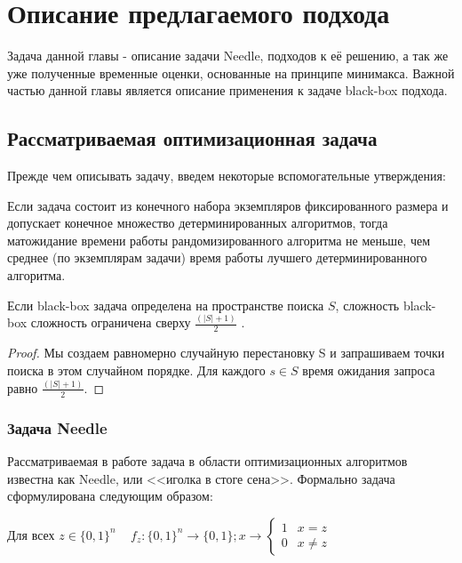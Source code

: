 \chapter{Описание предлагаемого подхода}
\label{chapter2}

Задача данной главы - описание задачи Needle, подходов к её решению, а так же уже полученные временные оценки, основанные на принципе минимакса. Важной частью данной главы является описание применения к задаче black-box подхода.

\section{Рассматриваемая оптимизационная задача}

Прежде чем описывать задачу, введем некоторые вспомогательные утверждения:

\begin{prop}
Если задача состоит из конечного набора экземпляров фиксированного размера и допускает конечное множество детерминированных алгоритмов, тогда матожидание времени работы рандомизированного алгоритма не меньше, чем среднее (по экземплярам задачи) время работы лучшего детерминированного алгоритма.
\end{prop}


\begin{prop}
Если black-box задача определена на пространстве поиска $S$, сложность black-box сложность ограничена сверху $ \frac{(| S | + 1)}{2}$ \cite{2}.
\end{prop}



\begin{proof}
    Мы создаем равномерно случайную перестановку S и запрашиваем точки поиска в этом случайном порядке. Для каждого $s \in S$ время ожидания запроса равно  $ \frac{(| S | + 1)}{2}$.
\end{proof}


\subsection{Задача Needle}
Рассматриваемая в работе задача в области оптимизационных алгоритмов известна как Needle, или <<иголка в стоге сена>>. Формально задача сформулирована следующим образом: 

Для всех $z \in \{0, 1\}^n \;\;\; $  
    \begin{math} 
    f_{z} : \{0, 1 \}^n \rightarrow \{0,1\}; x \rightarrow  \left\{ \begin{array}{ll}
    1 & \textrm{$x = z$}\\
    0 & \textrm{$x \ne z$}
    \end{array} \right.
    \end{math}

